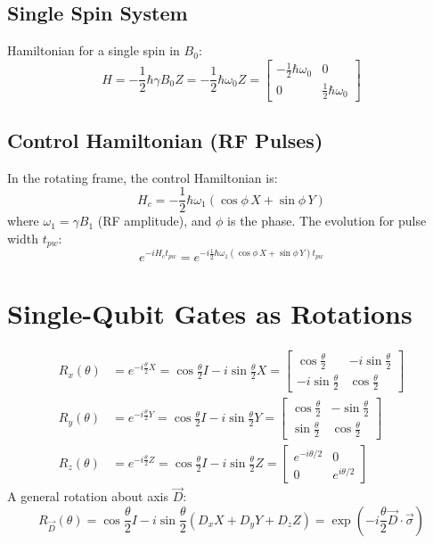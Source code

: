 \documentclass{book}
\begin{document}
\subsection*{Single Spin System}
Hamiltonian for a single spin in $B_0$:
\[
H = -\frac{1}{2}\hbar\gamma B_0 Z = -\frac{1}{2}\hbar\omega_0 Z =
\begin{bmatrix}
-\frac{1}{2}\hbar\omega_0 & 0 \\
0 & \frac{1}{2}\hbar\omega_0
\end{bmatrix}
\]

\subsection*{Control Hamiltonian (RF Pulses)}
In the rotating frame, the control Hamiltonian is:
\[
H_c = -\frac{1}{2}\hbar\omega_1(\cos\phi\, X + \sin\phi\, Y)
\]
where $\omega_1 = \gamma B_1$ (RF amplitude), and $\phi$ is the phase. The evolution for pulse width $t_{pw}$:
\[
e^{-iH_c t_{pw}} = e^{-i\frac{1}{2}\hbar\omega_1(\cos\phi\, X + \sin\phi\, Y)t_{pw}}
\]

\section{Single-Qubit Gates as Rotations}
\begin{align*}
R_x(\theta) &= e^{-i\frac{\theta}{2}X} = \cos\frac{\theta}{2}I - i\sin\frac{\theta}{2}X =
\begin{bmatrix}
\cos\frac{\theta}{2} & -i\sin\frac{\theta}{2} \\
-i\sin\frac{\theta}{2} & \cos\frac{\theta}{2}
\end{bmatrix} \\
R_y(\theta) &= e^{-i\frac{\theta}{2}Y} = \cos\frac{\theta}{2}I - i\sin\frac{\theta}{2}Y =
\begin{bmatrix}
\cos\frac{\theta}{2} & -\sin\frac{\theta}{2} \\
\sin\frac{\theta}{2} & \cos\frac{\theta}{2}
\end{bmatrix} \\
R_z(\theta) &= e^{-i\frac{\theta}{2}Z} = \cos\frac{\theta}{2}I - i\sin\frac{\theta}{2}Z =
\begin{bmatrix}
e^{-i\theta/2} & 0 \\
0 & e^{i\theta/2}
\end{bmatrix}
\end{align*}
A general rotation about axis $\vec{D}$:
\[
R_{\vec{D}}(\theta) = \cos\frac{\theta}{2}I - i\sin\frac{\theta}{2}(D_x X + D_y Y + D_z Z) = \exp\left(-i\frac{\theta}{2}\vec{D}\cdot\vec{\sigma}\right)
\]
\end{document}
